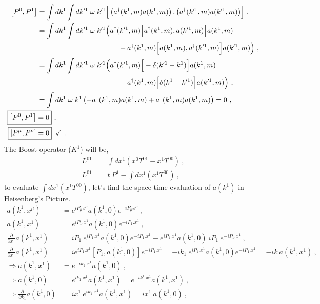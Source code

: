 \documentclass[12pt,a4paper]{report}
\begin{document}
      \begin{align}
          \left[P^0,P^1\right]&=\int dk^1 \int dk'^1 \;\omega\; k'^1\Bigr[\left (a^{\dagger}(k^1,m)a(k^1,m)\right),\left (a^{\dagger}(k'^1,m)a(k'^1,m)\right)\Bigr]~, \nonumber\\
          &=\int dk^1 \int dk'^1 \;\omega\; k'^1\Bigr(a^{\dagger}(k'^1,m)\Bigr[a^{\dagger}(k^1,m),a(k'^1,m)\Bigr]a(k^1,m)\nonumber\\ 
		&~~~~~~~~~~~~~~~~~~~~~~~~~~~~~~~~~~+a^{\dagger}(k^1,m) \Bigr[a(k^1,m),a^{\dagger}(k'^1,m)\Bigr]a(k'^1,m)\Bigr)~,\nonumber\\
          &=\int dk^1 \int dk'^1 \;\omega\; k'^1\Bigr(a^{\dagger}(k'^1,m)\Bigr[-\delta(k'^1-k^1)\Bigr]a(k^1,m)\nonumber\\ 
		&~~~~~~~~~~~~~~~~~~~~~~~~~~~~~~~~~~+a^{\dagger}(k^1,m) \Bigr[\delta(k^1-k'^1)\Bigr]a(k'^1,m)\Bigr)~,\nonumber\\
          &=\int dk^1  \;\omega\; k^1\left(-a^{\dagger}(k^1,m)a(k^1,m)+a^{\dagger}(k^1,m) a(k^1,m)\right)=0~,\nonumber\\
          \Aboxed{\left[P^0,P^1\right]&=0} \nonumber~,\\
          \Aboxed{\left[P^\mu,P^\nu\right]&=0}\;\;\checkmark~.
      \end{align}
The Boost operator ($K^1$) will be,	
     \begin{align}
       L^{01}&=\int dx^1\left(x^{0 }T^{01 }-x^{1 }T^{00 } \right)~, \nonumber\\
       L^{01}&=t~ P^1-\int dx^1\left(x^1 T^{00} \right)~,
      \end{align}
to evaluate $\int dx^1\left(x^1 T^{00} \right) \nonumber$, let's find the space-time evaluation of $a(k^1)$ in Heisenberg's Picture.\cite{Riccardo}
   \begin{align}
       a(k^1,x^\mu)&=e^{iP_\mu x^\mu}a(k^1,0)e^{-iP_\mu x^\mu}~,\nonumber\\
       a(k^1,x^1)&=e^{iP_1. x^1}a(k^1,0)e^{-iP_1.x^1}~,\nonumber\\
       \frac{\partial}{\partial x^1}a(k^1,x^1)&=iP_1~e^{iP_1. x^1}a(k^1,0)e^{-iP_1.x^1}-e^{iP_1. x^1}a(k^1,0)~iP_1~e^{-iP_1.x^1}~,\nonumber\\
       \frac{\partial}{\partial x^1}a(k^1,x^1)&=ie^{iP_1. x^1}\left[P_1,a(k^1,0)\right]e^{-iP_1.x^1}=-ik_1~e^{iP_1.x^1}a(k^1,0)e^{-iP_1.x^1}=-ik~a(k^1,x^1)~,\nonumber\\
       \Longrightarrow a(k^1,x^1)&=e^{-ik_1.x^1}a(k^1,0)~,\nonumber\\
       \Longrightarrow a(k^1,0)&=e^{ik_1.x^1}a(k^1,x^1)=e^{-ik^1.x^1}a(k^1,x^1)~,\nonumber\\
       \Longrightarrow \frac{\partial}{\partial k_1}a(k^1,0)&=ix^1~e^{ik_1.x^1}a(k^1,x^1)=ix^1~a(k^1,0)~,\nonumber
   \end{align}
\end{document}
